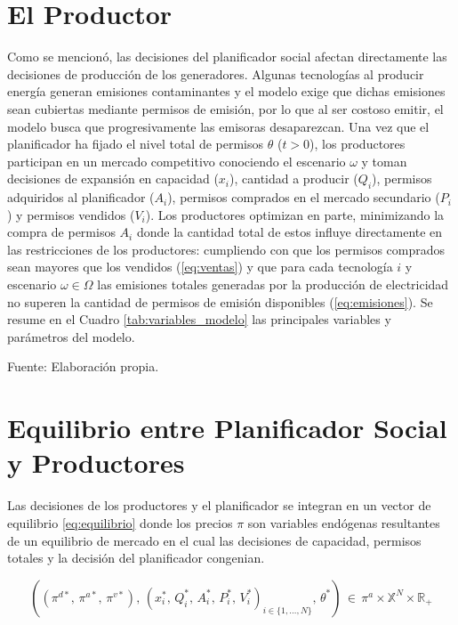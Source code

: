 \section{El Productor}
Como se mencionó, las decisiones del planificador social afectan directamente las decisiones de producción de los generadores. Algunas tecnologías al producir energía generan emisiones contaminantes y el modelo exige que dichas emisiones sean cubiertas mediante permisos de emisión, por lo que al ser costoso emitir, el modelo busca que progresivamente las emisoras desaparezcan. Una vez que el planificador ha fijado el nivel total de permisos $\theta$ ($t>0$), los productores participan en un mercado competitivo conociendo el escenario $\omega$ y toman decisiones de expansión en capacidad ($x_i$), cantidad a producir ($Q_i$), permisos adquiridos al planificador ($A_i$), permisos comprados en el mercado secundario ($P_i$) y permisos vendidos ($V_i$). Los productores optimizan en parte, minimizando la compra de permisos $A_i$ donde la cantidad total de estos influye directamente en las restricciones de los productores: cumpliendo con que los permisos comprados sean mayores que los vendidos (\ref{eq:ventas}) y que para cada tecnología $i$ y escenario $\omega \in \Omega$ las emisiones totales generadas por la producción de electricidad no superen la cantidad de permisos de emisión disponibles (\ref{eq:emisiones}). Se resume en el Cuadro \ref{tab:variables_modelo} las principales variables y parámetros del modelo.

\begin{table}[h!]
\centering
\caption{Nomenclatura modelo \protect{}}
\label{tab:variables_modelo}
\tablaNomenclaturaAmigo{}
\vspace{0.1cm}
\footnotesize{Fuente: Elaboración propia.}
\end{table}

\section{Equilibrio entre Planificador Social y Productores}
Las decisiones de los productores y el planificador se integran en un vector de equilibrio \ref{eq:equilibrio} donde los precios $\pi$ son variables endógenas resultantes de un equilibrio de mercado en el cual las decisiones de capacidad, permisos totales y la decisión del planificador congenian. 

\begin{equation}
\label{eq:equilibrio}
\left( 
\left( \pi^{d*},\, \pi^{a*},\, \pi^{v*} \right),
\, \left( x_i^{*},\, Q_i^{*},\, A_i^{*},\, P_i^{*},\, V_i^{*} \right)_{i \in \{1,\ldots,N\}},
\, \theta^{*}
\right)
\,\in\,
\pi^a\times \mathbb{X}^{N} \times \mathbb{R}_{+}
\end{equation}


